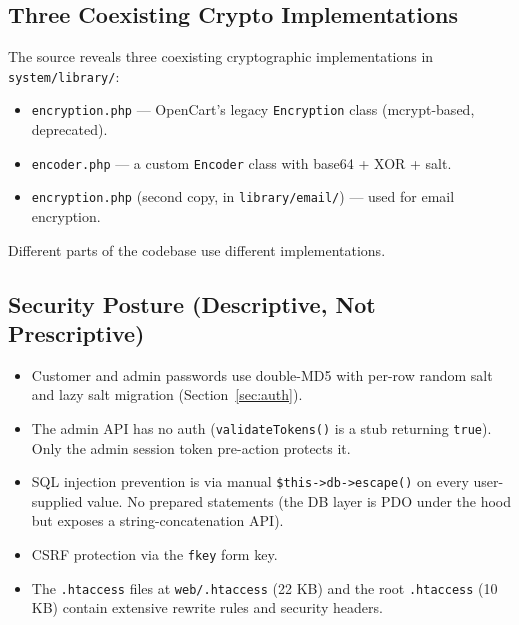 \documentclass[11pt,a4paper]{article}
\begin{document}
\subsection{Three Coexisting Crypto Implementations}

The source reveals three coexisting cryptographic implementations
in \texttt{system/library/}:

\begin{itemize}[leftmargin=1.6em,itemsep=2pt]
  \item \texttt{encryption.php} --- OpenCart's legacy
        \texttt{Encryption} class (mcrypt-based, deprecated).
  \item \texttt{encoder.php} --- a custom \texttt{Encoder} class
        with base64 + XOR + salt.
  \item \texttt{encryption.php} (second copy, in
        \texttt{library/email/}) --- used for email encryption.
\end{itemize}

Different parts of the codebase use different implementations.

\subsection{Security Posture (Descriptive, Not Prescriptive)}

\begin{itemize}[leftmargin=1.6em,itemsep=2pt]
  \item Customer and admin passwords use double-MD5 with per-row
        random salt and lazy salt migration
        (Section~\ref{sec:auth}).
  \item The admin API has no auth (\texttt{validateTokens()} is a
        stub returning \texttt{true}). Only the admin session
        token pre-action protects it.
  \item SQL injection prevention is via manual
        \texttt{\$this->db->escape()} on every user-supplied
        value. No prepared statements (the DB layer is PDO under
        the hood but exposes a string-concatenation API).
  \item CSRF protection via the \texttt{fkey} form key.
  \item The \texttt{.htaccess} files at \texttt{web/.htaccess}
        (22 KB) and the root \texttt{.htaccess} (10 KB) contain
        extensive rewrite rules and security headers.
\end{itemize}

\end{document}
